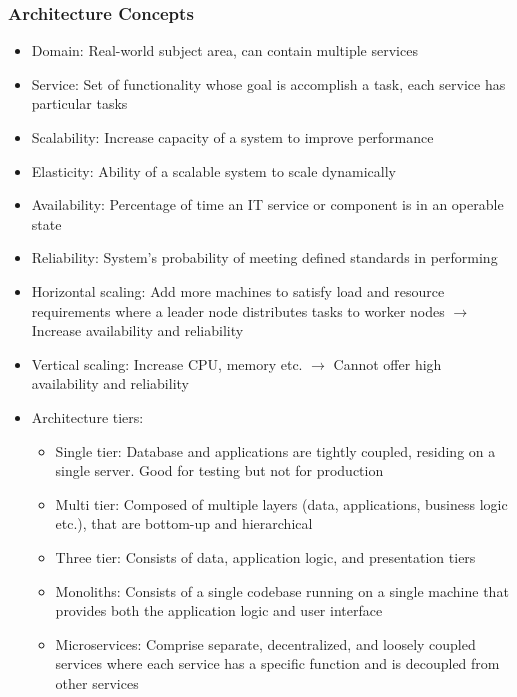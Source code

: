 \documentclass[11pt]{scrartcl}
\begin{document}
\subsubsection*{Architecture Concepts}
\begin{itemize}
	\item Domain: Real-world subject area, can contain multiple services
	\item Service: Set of functionality whose goal is accomplish a task, each service has particular tasks
	\item Scalability: Increase capacity of a system to improve performance
	\item Elasticity: Ability of a scalable system to scale dynamically
	\item Availability: Percentage of time an IT service or component is in an operable state
	\item Reliability: System's probability of meeting defined standards in performing
	\item Horizontal scaling: Add more machines to satisfy load and resource requirements where a leader node distributes tasks to worker nodes $\to$ Increase availability and reliability
	\item Vertical scaling: Increase CPU, memory etc. $\to$ Cannot offer high availability and reliability
	\item Architecture tiers:
	\begin{itemize}
		\item Single tier: Database and applications are tightly coupled, residing on a single server. Good for testing but not for production
		\item Multi tier: Composed of multiple layers (data, applications, business logic etc.), that are bottom-up and hierarchical
		\item Three tier: Consists of data, application logic, and presentation tiers
		\item Monoliths: Consists of a single codebase running on a single machine that provides both the application logic and user interface
		\item Microservices: Comprise separate, decentralized, and loosely coupled services where each service has a specific function and is decoupled from other services
	\end{itemize}
\end{itemize}
\end{document}
